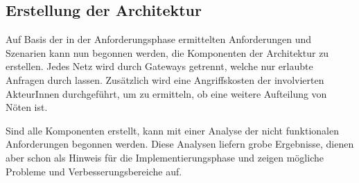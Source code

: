 \subsection{Erstellung der Architektur}
Auf Basis der in der Anforderungsphase ermittelten Anforderungen und Szenarien kann nun begonnen werden, die Komponenten der Architektur zu erstellen. Jedes Netz wird durch Gateways getrennt, welche nur erlaubte Anfragen durch lassen. Zusätzlich wird eine Angriffskosten der involvierten AkteurInnen durchgeführt, um zu ermitteln, ob eine weitere Aufteilung von Nöten ist.

Sind alle Komponenten erstellt, kann mit einer Analyse der nicht funktionalen Anforderungen begonnen werden. Diese Analysen liefern grobe Ergebnisse, dienen aber schon als Hinweis für die Implementierungsphase und zeigen mögliche Probleme und Verbesserungsbereiche auf.